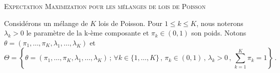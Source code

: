 \documentclass[a4paper,10pt,fleqn]{article}
\newcommand{\1}{\ensuremath{\mathbbm{1}}}
\begin{document}


\noindent\hrulefill

\begin{center}
\textsc{Expectation Maximization pour les m\'elanges de lois de Poisson}
\end{center}
\hrulefill

\medskip

Consid\'erons un m\'elange de $K$ lois de Poisson. Pour $1\leq k \leq K$, nous noterons $\lambda_k>0$ le param\`etre de la k-\`eme composante et $\pi_k\in(0,1)$ son poids. Notons $\theta = (\pi_1,\ldots,\pi_K,\lambda_1,\ldots,\lambda_K)$ et 
$$
\Theta = \left\{\theta = (\pi_1,\ldots,\pi_K,\lambda_1,\ldots,\lambda_K)\,;\, \forall k \in\{1,\ldots,K\}\,,\, \pi_k\in(0,1)\,,\,\lambda_k>0\,,\, \sum_{k=1}^K\pi_k = 1\right\}\,.
$$
\end{document}
